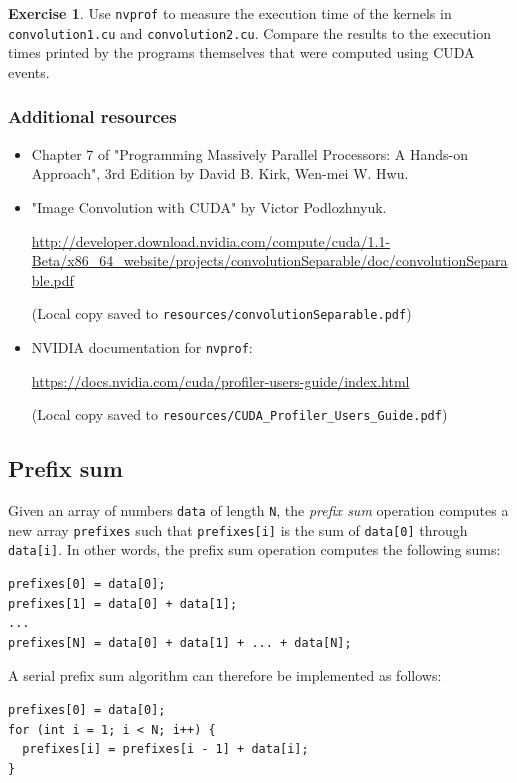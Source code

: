 \documentclass{article}
\newcommand{\resource}[1]{(Local copy saved to \texttt{#1})}
\theoremstyle{definition}
\newtheorem{exercise}{Exercise}
\begin{document}
\begin{exercise}
Use \texttt{nvprof} to measure the execution time of the kernels in \texttt{convolution1.cu} and \texttt{convolution2.cu}. Compare the results to the execution times printed by the programs themselves that were computed using CUDA events.
\end{exercise}

\subsubsection*{Additional resources}
\begin{itemize}
    \item Chapter 7 of "Programming Massively Parallel Processors: A Hands-on Approach", 3rd Edition by David B. Kirk, Wen-mei W. Hwu.
    
    \item "Image Convolution with CUDA" by Victor Podlozhnyuk.
    
    \url{http://developer.download.nvidia.com/compute/cuda/1.1-Beta/x86_64_website/projects/convolutionSeparable/doc/convolutionSeparable.pdf}
    
    \resource{resources/convolutionSeparable.pdf}
    
    \item NVIDIA documentation for \texttt{nvprof}:
    
    \url{https://docs.nvidia.com/cuda/profiler-users-guide/index.html}
    
    \resource{resources/CUDA\_Profiler\_Users\_Guide.pdf}
\end{itemize}

\subsection{Prefix sum}
Given an array of numbers \texttt{data} of length \texttt{N}, the \emph{prefix sum} operation computes a new array \texttt{prefixes} such that \texttt{prefixes[i]} is the sum of \texttt{data[0]} through \texttt{data[i]}. In other words, the prefix sum operation computes the following sums:

\begin{verbatim}
prefixes[0] = data[0];
prefixes[1] = data[0] + data[1];
...
prefixes[N] = data[0] + data[1] + ... + data[N];
\end{verbatim}

A serial prefix sum algorithm can therefore be implemented as follows:

\begin{verbatim}
prefixes[0] = data[0];
for (int i = 1; i < N; i++) {
  prefixes[i] = prefixes[i - 1] + data[i];
}
\end{verbatim}
\end{document}
